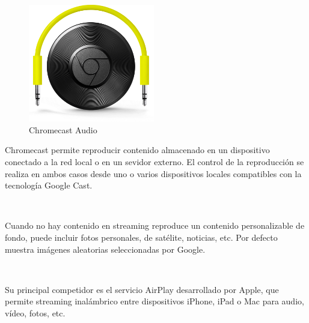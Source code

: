\begin{figure}[h]
	\centering
	\includegraphics[width=0.49\textwidth]{./Imagenes/chromecastaudio.png}
	\caption{Chromecast Audio}\label{fig:audio}
\end{figure}

Chromecast permite reproducir contenido almacenado en un dispositivo conectado a la red local o en un sevidor externo. El control de la reproducción se realiza en ambos casos desde uno o varios dispositivos locales compatibles con la tecnología Google Cast.

\

Cuando no hay contenido en streaming reproduce un contenido personalizable de fondo, puede incluir fotos personales,
de satélite, noticias, etc. Por defecto muestra imágenes aleatorias seleccionadas por Google.

\

Su principal competidor es el servicio AirPlay desarrollado por Apple, que permite streaming inalámbrico entre dispositivos iPhone, iPad o Mac para audio, vídeo, fotos, etc.
